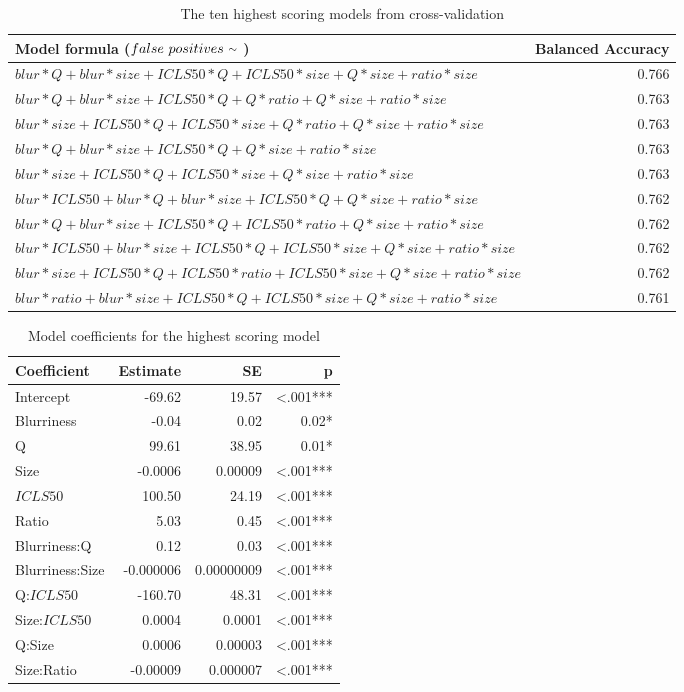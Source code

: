 \documentclass[12pt]{article}
\newcommand{\mytilde}{\raise.17ex\hbox{$\scriptstyle\mathtt{\sim}$}} %
\begin{document}
\begin{table}[ht]
	\caption{The ten highest scoring models from cross-validation}
	\tiny
	\begin{center}
	\begin{tabular}{lr}
		\toprule
		Model formula ($false \ positives \ \mytilde \ $) & Balanced Accuracy \\ 
		\midrule
		$blur*Q+blur*size+ICLS50*Q+ICLS50*size+Q*size+ratio*size$ & 0.766 \\
		$blur*Q+blur*size+ICLS50*Q+Q*ratio+Q*size+ratio*size$ & 0.763 \\
		$blur*size+ICLS50*Q+ICLS50*size+Q*ratio+Q*size+ratio*size$ & 0.763 \\
		$blur*Q+blur*size+ICLS50*Q+Q*size+ratio*size$ & 0.763 \\
		$blur*size+ICLS50*Q+ICLS50*size+Q*size+ratio*size$ & 0.763 \\
		$blur*ICLS50+blur*Q+blur*size+ICLS50*Q+Q*size+ratio*size$ & 0.762 \\
		$blur*Q+blur*size+ICLS50*Q+ICLS50*ratio+Q*size+ratio*size$ & 0.762 \\
		$blur*ICLS50+blur*size+ICLS50*Q+ICLS50*size+Q*size+ratio*size$ & 0.762 \\
		$blur*size+ICLS50*Q+ICLS50*ratio+ICLS50*size+Q*size+ratio*size$ & 0.762 \\
		$blur*ratio+blur*size+ICLS50*Q+ICLS50*size+Q*size+ratio*size$ & 0.761 \\  
		\bottomrule
	\end{tabular}
	\end{center}
	\label{tab:CVtop10}
\end{table}

\begin{table}[ht]
	\caption{Model coefficients for the highest scoring model}
	\begin{center}
	\begin{tabular}{lrrr}
		\toprule
		Coefficient & Estimate & SE & p \\ 
		\midrule
		Intercept & -69.62 & 19.57 & \textless .001***\\
		Blurriness & -0.04 & 0.02 & 0.02*\\
		Q & 99.61 & 38.95 &  0.01*\\
		Size & -0.0006 & 0.00009 & \textless .001***\\
		$ICLS50$ & 100.50 & 24.19 & \textless .001***\\
		Ratio & 5.03 & 0.45 & \textless .001***\\
		Blurriness:Q & 0.12 & 0.03 & \textless .001***\\
		Blurriness:Size & -0.000006 & 0.00000009 & \textless .001***\\
		Q:$ICLS50$ & -160.70 & 48.31 & \textless .001*** \\
		Size:$ICLS50$ &  0.0004 & 0.0001 & \textless .001***\\
		Q:Size &  0.0006 & 0.00003 &  \textless .001*** \\
		Size:Ratio & -0.00009 & 0.000007 & \textless .001*** \\ 
		\bottomrule
	\end{tabular}
	\end{center}
	\label{tab:CVtopmodel}
\end{table}
\end{document}
